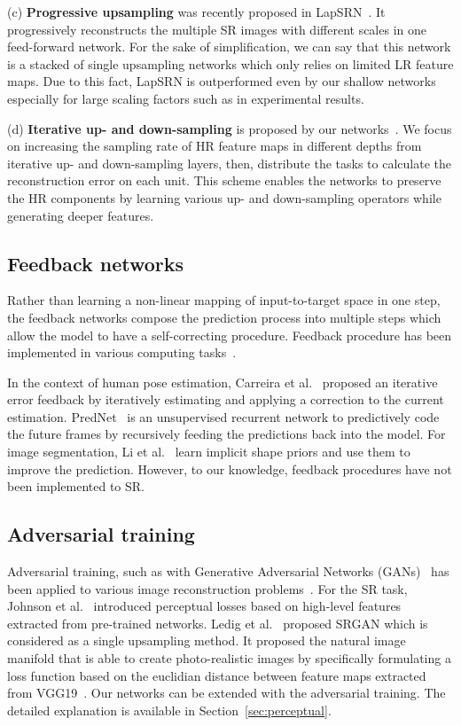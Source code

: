 \documentclass[10pt,journal,compsoc]{IEEEtran}
\begin{document}
(c) \textbf{Progressive upsampling} was recently proposed in
LapSRN~\cite{LapSRN}. It progressively reconstructs the multiple SR
images with different scales in one feed-forward network. For the sake
of simplification, we can say that this network is a stacked of single upsampling networks which only relies on limited LR feature maps. 
Due to this fact, LapSRN is outperformed even by our shallow networks especially for large scaling factors such as  in experimental results.

(d) \textbf{Iterative up- and down-sampling} is proposed by our networks~\cite{haris2018deep}. We focus on increasing the sampling rate of HR feature maps in different depths from iterative up- and down-sampling layers, then, distribute the tasks to calculate the reconstruction error on each unit. This scheme enables the networks to preserve the HR components by learning various up- and down-sampling operators while generating deeper features.

\subsection{Feedback networks} 
Rather than learning a non-linear mapping of input-to-target space in one step, the feedback networks compose the prediction process into multiple steps which allow the model to have a self-correcting procedure. Feedback procedure has been implemented in various computing tasks~\cite{carreira2016human,ross2011learning,tu2010auto,li2016iterative,zamir2016feedback, shrivastava2016contextual,lotter2016deep}.

In the context of human pose estimation, Carreira et al.~\cite{carreira2016human} proposed an iterative error feedback by
iteratively estimating and applying a correction to the current
estimation. PredNet~\cite{lotter2016deep} is an unsupervised recurrent
network to predictively code the future frames by recursively feeding
the predictions back into the model. For image segmentation, Li et
al.~\cite{li2016iterative} learn implicit shape priors and use them to
improve the prediction. However, to our knowledge, feedback procedures
have not been implemented to SR.

\subsection{Adversarial training}
Adversarial training, such as with Generative Adversarial Networks (GANs)~\cite{goodfellow2014generative} has been applied to various image reconstruction problems~\cite{ledig2016photo, sajjadi2016enhancenet, radford2015unsupervised, denton2015deep, johnson2016perceptual}. For the SR task, Johnson et al.~\cite{johnson2016perceptual} introduced perceptual losses based on high-level features extracted from pre-trained networks. Ledig et al.~\cite{ledig2016photo} proposed SRGAN which is considered as a single upsampling method. It proposed the natural image manifold that is able to create photo-realistic images by specifically formulating a loss function based on the euclidian distance between feature maps extracted from VGG19~\cite{simonyan2014very}. Our networks can be extended with the adversarial training. The detailed explanation is available in Section~\ref{sec:perceptual}.
\end{document}
